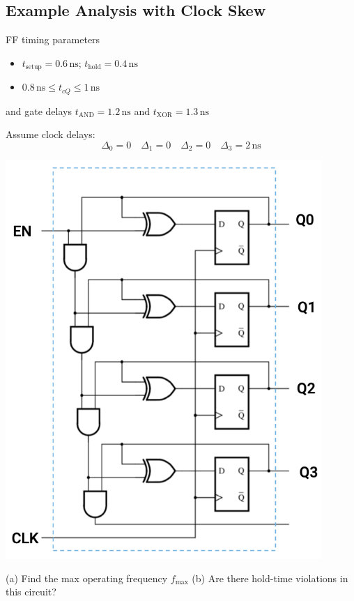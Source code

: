 \documentclass[12pt,openany]{book}
\begin{document}
\subsection{Example Analysis with Clock Skew}
\begin{minipage}[htp]{0.45\textwidth}
FF timing parameters 
\begin{itemize}
    \item[] \( t_{\text{setup}} = 0.6 \, \text{ns} \); \( t_{\text{hold}} = 0.4 \, \text{ns} \)
    \item[] \( 0.8 \, \text{ns} \leq t_{cQ} \leq 1 \, \text{ns} \)
\end{itemize}
and gate delays \( t_{\text{AND}} = 1.2 \, \text{ns} \) and \( t_{\text{XOR}} = 1.3 \, \text{ns} \)

Assume clock delays:
\[
\Delta_0 = 0 \quad \Delta_1 = 0 \quad \Delta_2 = 0 \quad \Delta_3 = 2 \, \text{ns}
\]
\end{minipage}%
\hfill
\vline
\hfill
\begin{minipage}[htp]{0.45\textwidth}
\includegraphics[width=0.9\textwidth]{circuits/15.7.5.png}
\end{minipage}

\begin{justify}
	(a) Find the max operating frequency \( f_{\text{max}} \)\newline
	(b) Are there hold-time violations in this circuit?
\end{justify}
\end{document}
